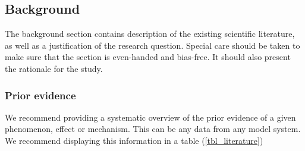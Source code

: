 \subsection{Background} 


\begin{prereg}
\begin{instruction}
The background section contains description of the existing scientific literature, as well as a justification of the research question. Special care should be taken to make sure that the section is even-handed and bias-free. It should also present the rationale for the study.
\end{instruction}
\end{prereg}

\subsubsection{Prior evidence}
\begin{prereg}
\begin{instruction}
We recommend providing a systematic overview of the prior evidence of a given phenomenon, effect or mechanism. This can be any data from any model system. We recommend displaying this information in a table (\cref{tbl_literature})
\end{instruction}
\end{prereg}



